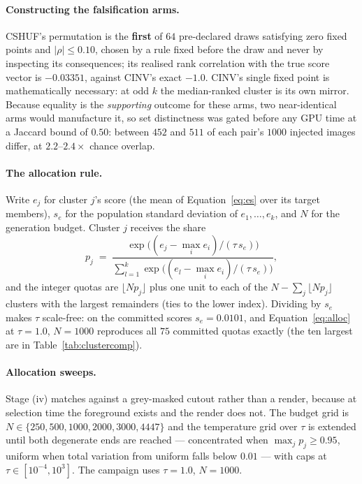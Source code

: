 \documentclass{article}
\newcommand{\atemp}{\tau}
\begin{document}
\paragraph{Constructing the falsification arms.} CSHUF's permutation is the \textbf{first} of $64$
pre-declared draws satisfying zero fixed points and $|\rho| \leq 0.10$, chosen by a rule fixed
before the draw and never by inspecting its consequences; its realised rank correlation with the
true score vector is $-0.03351$, against CINV's exact $-1.0$. CINV's single fixed point is
mathematically necessary: at odd $k$ the median-ranked cluster is its own mirror. Because equality
is the \emph{supporting} outcome for these arms, two near-identical arms would manufacture it, so
set distinctness was gated before any GPU time at a Jaccard bound of $0.50$: between $452$ and $511$
of each pair's $1000$ injected images differ, at $2.2$--$2.4\times$ chance overlap.

\paragraph{The allocation rule.} Write $e_j$ for cluster $j$'s score (the mean of Equation~\ref{eq:es}
over its target members), $s_e$ for the population standard deviation of $e_1, \dots, e_k$, and $N$
for the generation budget. Cluster $j$ receives the share
\begin{equation}
p_j \;=\; \frac{\exp\!\big((e_j - \max_i e_i)/(\atemp\, s_e)\big)}{\sum_{l=1}^{k} \exp\!\big((e_l - \max_i e_i)/(\atemp\, s_e)\big)},
\label{eq:alloc}
\end{equation}
and the integer quotas are $\lfloor N p_j \rfloor$ plus one unit to each of the $N - \sum_j \lfloor N p_j \rfloor$
clusters with the largest remainders (ties to the lower index). Dividing by $s_e$ makes $\atemp$
scale-free: on the committed scores $s_e = 0.0101$, and Equation~\ref{eq:alloc} at $\atemp = 1.0$,
$N = 1000$ reproduces all $75$ committed quotas exactly (the ten largest are in
Table~\ref{tab:clustercomp}).

\paragraph{Allocation sweeps.} Stage (iv) matches against a grey-masked cutout rather than a render,
because at selection time the foreground exists and the render does not. The budget grid is
$N \in \{250, 500, 1000, 2000, 3000, 4447\}$ and the temperature grid over $\atemp$ is extended
until both degenerate ends are reached --- concentrated when $\max_j p_j \geq 0.95$, uniform when
total variation from uniform falls below $0.01$ --- with caps at $\atemp \in [10^{-4}, 10^{3}]$. The
campaign uses $\atemp = 1.0$, $N = 1000$.
\end{document}
